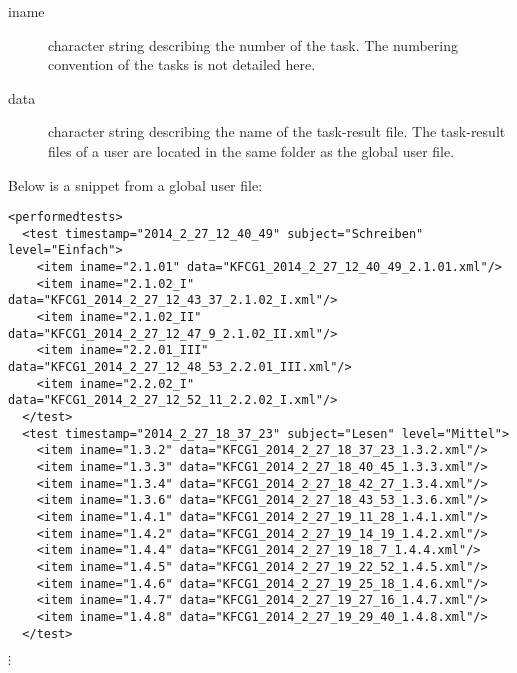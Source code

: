 \documentclass{scrartcl}
\begin{document}
\begin{description}
\item[iname] character string describing the number of the task. The numbering convention of the tasks is not detailed here.
\item[data] character string describing the name of the task-result file. The task-result files of a user are located in the same folder as the global user file. 
\end{description}
Below is a snippet from a global user file:
\begin{verbatim}  
<performedtests>
  <test timestamp="2014_2_27_12_40_49" subject="Schreiben" level="Einfach">
    <item iname="2.1.01" data="KFCG1_2014_2_27_12_40_49_2.1.01.xml"/>
    <item iname="2.1.02_I" data="KFCG1_2014_2_27_12_43_37_2.1.02_I.xml"/>
    <item iname="2.1.02_II" data="KFCG1_2014_2_27_12_47_9_2.1.02_II.xml"/>
    <item iname="2.2.01_III" data="KFCG1_2014_2_27_12_48_53_2.2.01_III.xml"/>
    <item iname="2.2.02_I" data="KFCG1_2014_2_27_12_52_11_2.2.02_I.xml"/>
  </test>
  <test timestamp="2014_2_27_18_37_23" subject="Lesen" level="Mittel">
    <item iname="1.3.2" data="KFCG1_2014_2_27_18_37_23_1.3.2.xml"/>
    <item iname="1.3.3" data="KFCG1_2014_2_27_18_40_45_1.3.3.xml"/>
    <item iname="1.3.4" data="KFCG1_2014_2_27_18_42_27_1.3.4.xml"/>
    <item iname="1.3.6" data="KFCG1_2014_2_27_18_43_53_1.3.6.xml"/>
    <item iname="1.4.1" data="KFCG1_2014_2_27_19_11_28_1.4.1.xml"/>
    <item iname="1.4.2" data="KFCG1_2014_2_27_19_14_19_1.4.2.xml"/>
    <item iname="1.4.4" data="KFCG1_2014_2_27_19_18_7_1.4.4.xml"/>
    <item iname="1.4.5" data="KFCG1_2014_2_27_19_22_52_1.4.5.xml"/>
    <item iname="1.4.6" data="KFCG1_2014_2_27_19_25_18_1.4.6.xml"/>
    <item iname="1.4.7" data="KFCG1_2014_2_27_19_27_16_1.4.7.xml"/>
    <item iname="1.4.8" data="KFCG1_2014_2_27_19_29_40_1.4.8.xml"/>
  </test>
\end{verbatim}
\quad$\vdots$
\end{document}
